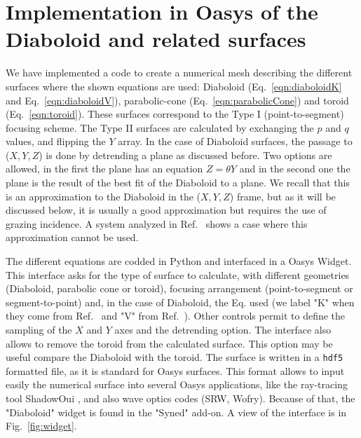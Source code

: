 \documentclass{iucr}              %
\begin{document}
\section{Implementation in Oasys of the Diaboloid and related surfaces}
\label{sec:oasys}

We have implemented a code to create a numerical mesh describing the different surfaces where the shown equations are used: Diaboloid (Eq.~\ref{eqn:diaboloidK} and Eq.~\ref{eqn:diaboloidV}), parabolic-cone (Eq.~\ref{eqn:parabolicCone}) and toroid (Eq.~\ref{eqn:toroid}). These surfaces correspond to the Type I (point-to-segment) focusing scheme. The Type II surfaces are calculated by exchanging the $p$ and $q$ values, and flipping the $Y$ array. In the case of Diaboloid surfaces, the passage to ($X,Y,Z$) is done by detrending a plane as discussed before. Two options are allowed, in the first the plane has an equation $Z=\theta Y$ and in the second one the plane is the result of the best fit of the Diaboloid to a plane. We recall that this is an approximation to the Diaboloid in the ($X,Y,Z$) frame, but as it will be discussed below, it is usually a good approximation but requires the use of grazing incidence. A system analyzed in Ref.~\cite{Yashchuk2019} shows a case where this approximation cannot be used.  

The different equations are codded in Python and interfaced in a Oasys Widget. This interface asks for the type of surface to calculate, with different geometries (Diaboloid, parabolic cone or toroid), focusing arrangement (point-to-segment or segment-to-point) and, in the case of Diaboloid, the Eq. used (we label "K" when they come from Ref.~\cite{Goldberg2020} and "V" from Ref.~\cite{Valeriy2020b}). Other controls permit to define the sampling of the $X$ and $Y$ axes and the detrending option. The interface also allows to remove the toroid from the calculated surface. This option may be useful compare the Diaboloid with the toroid. The surface is written in a {\tt hdf5} formatted file, as it is standard for Oasys surfaces. This format allows to input easily the numerical surface into several Oasys applications, like the ray-tracing tool ShadowOui \cite{codeSHADOWOUI}, and also wave optics codes (SRW, Wofry). Because of that, the "Diaboloid" widget is found in the "Syned" add-on. A view of the interface is in Fig.~\ref{fig:widget}.
\end{document}
